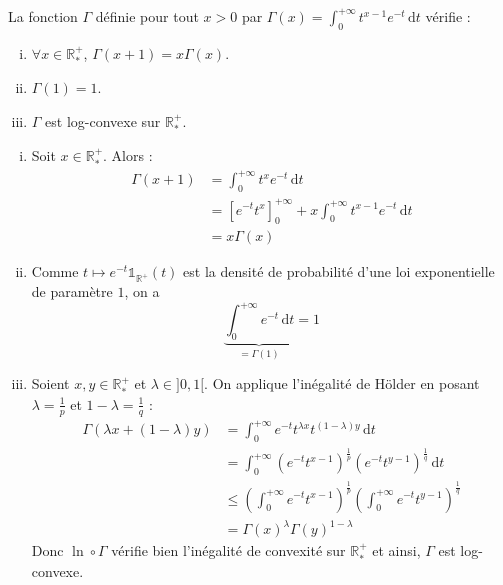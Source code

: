




	\begin{lemma}
		\label{caracterisation-reelle-de-gamma-1}
		La fonction $\Gamma$ définie pour tout $x > 0$ par $\Gamma(x) = \int_0^{+\infty} t^{x-1} e^{-t} \, \mathrm{d}t$ vérifie :
		\begin{enumerate}[(i)]
			\item $\forall x \in \mathbb{R}^+_*$, $\Gamma(x+1) = x\Gamma(x)$.
			\item $\Gamma(1) = 1$.
			\item $\Gamma$ est log-convexe sur $\mathbb{R}^+_*$.
		\end{enumerate}
	\end{lemma}

	\begin{demonstration}
		\begin{enumerate}[(i)]
			\item Soit $x \in \mathbb{R}^+_*$. Alors :
			\begin{align*}
				\Gamma(x+1) &= \int_0^{+\infty} t^x e^{-t} \, \mathrm{d}t \\
				&= \left[ e^{-t} t^x \right]_0^{+\infty} + x \int_0^{+\infty} t^{x-1} e^{-t} \, \mathrm{d}t \\
				&= x\Gamma(x)
			\end{align*}
			\item Comme $t \mapsto e^{-t} \mathbb{1}_{\mathbb{R}^+}(t)$ est la densité de probabilité d'une loi exponentielle de paramètre $1$, on a
			\[ \underbrace{\int_0^{+\infty} e^{-t} \, \mathrm{d}t}_{= \Gamma(1)} = 1 \]
			\item Soient $x, y \in \mathbb{R}^+_*$ et $\lambda \in ]0, 1[$. On applique l'inégalité de Hölder en posant $\lambda = \frac{1}{p}$ et $1-\lambda = \frac{1}{q}$ :
			\begin{align*}
				\Gamma(\lambda x + (1-\lambda) y) &= \int_0^{+\infty} e^{-t} t^{\lambda x} t^{(1-\lambda)y} \, \mathrm{d}t \\
				&= \int_0^{+\infty} (e^{-t} t^{x-1})^{\frac{1}{p}} (e^{-t} t^{y-1})^{\frac{1}{q}} \, \mathrm{d}t \\
				&\leq \left (\int_0^{+\infty} e^{-t} t^{x-1} \right)^{\frac{1}{p}} \left (\int_0^{+\infty} e^{-t} t^{y-1} \right)^{\frac{1}{q}} \\
				&= \Gamma(x)^\lambda \Gamma(y)^{1-\lambda}
			\end{align*}
			Donc $\ln \circ \Gamma$ vérifie bien l'inégalité de convexité sur $\mathbb{R}^+_*$ et ainsi, $\Gamma$ est log-convexe.
		\end{enumerate}
	\end{demonstration}

